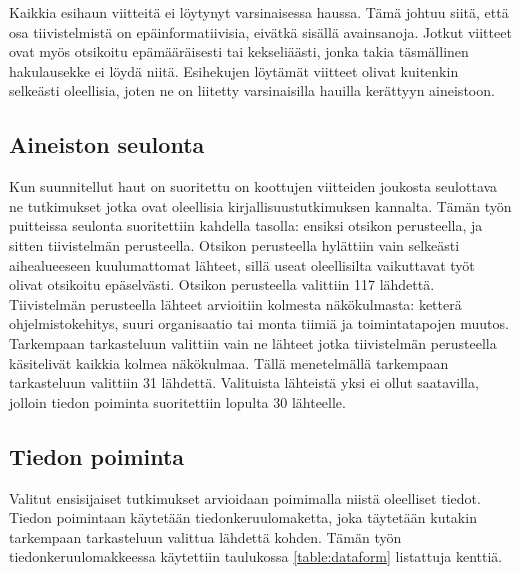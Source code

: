 Kaikkia esihaun viitteitä ei löytynyt varsinaisessa haussa. Tämä johtuu siitä,
että osa tiivistelmistä on epäinformatiivisia, eivätkä sisällä avainsanoja.
Jotkut viitteet ovat myös otsikoitu epämääräisesti tai kekseliäästi, jonka takia
täsmällinen hakulausekke ei löydä niitä. Esihekujen löytämät viitteet olivat
kuitenkin selkeästi oleellisia, joten ne on liitetty varsinaisilla hauilla
kerättyyn aineistoon.

\subsection{Aineiston seulonta}

Kun suunnitellut haut on suoritettu on koottujen viitteiden joukosta seulottava
ne tutkimukset jotka ovat oleellisia kirjallisuustutkimuksen kannalta. Tämän
työn puitteissa seulonta suoritettiin kahdella tasolla: ensiksi otsikon
perusteella, ja sitten tiivistelmän perusteella. Otsikon perusteella hylättiin
vain selkeästi aihealueeseen kuulumattomat lähteet, sillä useat oleellisilta
vaikuttavat työt olivat otsikoitu epäselvästi. Otsikon perusteella valittiin 117
lähdettä. Tiivistelmän perusteella lähteet arvioitiin kolmesta näkökulmasta:
ketterä ohjelmistokehitys, suuri organisaatio tai monta tiimiä ja
toimintatapojen muutos. Tarkempaan tarkasteluun valittiin vain ne lähteet jotka
tiivistelmän perusteella käsitelivät kaikkia kolmea näkökulmaa. Tällä
menetelmällä tarkempaan tarkasteluun valittiin 31 lähdettä. Valituista lähteistä
yksi ei ollut saatavilla, jolloin tiedon poiminta suoritettiin lopulta 30
lähteelle.

\subsection{Tiedon poiminta}

Valitut ensisijaiset tutkimukset arvioidaan poimimalla niistä oleelliset tiedot.
Tiedon poimintaan käytetään tiedonkeruulomaketta, joka täytetään kutakin
tarkempaan tarkasteluun valittua lähdettä kohden. Tämän työn
tiedonkeruulomakkeessa käytettiin taulukossa \ref{table:dataform} listattuja
kenttiä.

